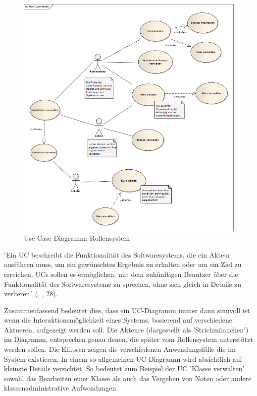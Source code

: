 \begin{figure}[H]
 \begin{center}
   \includegraphics[scale=0.5]{img/UseCaseModel_kuwasys20.png}
 \end{center}
 \caption[\textbf{Use Case Diagram: Rollensystem}]{Use Case Diagramm: Rollensystem}
 \label{fig:UML_UC_kuwasys20}
\end{figure}

'Ein \ac{UC} beschreibt die Funktionalität des Softwaresystems, die ein Akteur ausführen muss, um ein gewünschtes Ergebnis zu erhalten oder um ein Ziel zu erreichen. \ac{UC}s sollen es ermöglichen, mit dem zukünftigen Benutzer über die Funktionalität des Softwaresystems zu sprechen, ohne sich gleich in Details zu verlieren.' (, \cite{BalzertH-UML2}, 28).

Zusammenfassend bedeutet dies, dass ein \ac{UC-Diagramm} immer dann sinnvoll ist wenn die Interaktionsmöglichkeit eines Systems, basierend auf verschiedene Aktueren, aufgezeigt werden soll. Die Akteure (dargestellt als 'Strichmännchen') im Diagramm, entsprechen genau denen, die später vom Rollensystem unterstützt werden sollen. Die Ellipsen zeigen die verschiedenen Anwendungsfälle die im System existieren. In einem so allgemeinen \ac{UC-Diagramm} wird absichtlich auf kleinste Details verzichtet. So bedeutet zum Beispiel der \ac{UC} 'Klasse verwalten' sowohl das Bearbeiten einer Klasse als auch das Vergeben von Noten oder andere klassenadministrative Aufwendungen.

